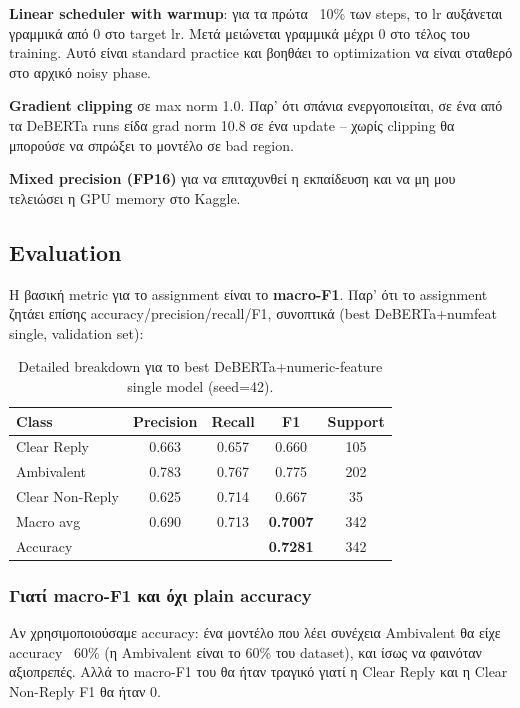 \documentclass[12pt]{fphw}
\begin{document}
\textbf{Linear scheduler with warmup}: για τα πρώτα ~10\% των steps, το lr αυξάνεται γραμμικά από 0 στο target lr. Μετά μειώνεται γραμμικά μέχρι 0 στο τέλος του training. Αυτό είναι standard practice και βοηθάει το optimization να είναι σταθερό στο αρχικό noisy phase.

\textbf{Gradient clipping} σε max norm 1.0. Παρ' ότι σπάνια ενεργοποιείται, σε ένα από τα DeBERTa runs είδα grad norm 10.8 σε ένα update -- χωρίς clipping θα μπορούσε να σπρώξει το μοντέλο σε bad region.

\textbf{Mixed precision (FP16)} για να επιταχυνθεί η εκπαίδευση και να μη μου τελειώσει η GPU memory στο Kaggle.

\subsection{Evaluation}

Η βασική metric για το assignment είναι το \textbf{macro-F1}. Παρ' ότι το assignment ζητάει επίσης accuracy/precision/recall/F1, συνοπτικά (best DeBERTa+numfeat single, validation set):

\begin{table}[H]
\centering
\begin{tabular}{lcccc}
\toprule
Class & Precision & Recall & F1 & Support \\
\midrule
Clear Reply & 0.663 & 0.657 & 0.660 & 105 \\
Ambivalent & 0.783 & 0.767 & 0.775 & 202 \\
Clear Non-Reply & 0.625 & 0.714 & 0.667 & 35 \\
\midrule
Macro avg & 0.690 & 0.713 & \textbf{0.7007} & 342 \\
Accuracy & & & \textbf{0.7281} & 342 \\
\bottomrule
\end{tabular}
\caption{Detailed breakdown για το best DeBERTa+numeric-feature single model (seed=42).}
\label{tab:detailed_metrics}
\end{table}

\subsubsection{Γιατί macro-F1 και όχι plain accuracy}

Αν χρησιμοποιούσαμε accuracy: ένα μοντέλο που λέει συνέχεια Ambivalent θα είχε accuracy ~60\% (η Ambivalent είναι το 60\% του dataset), και ίσως να φαινόταν αξιοπρεπές. Αλλά το macro-F1 του θα ήταν τραγικό γιατί η Clear Reply και η Clear Non-Reply F1 θα ήταν 0.
\end{document}
